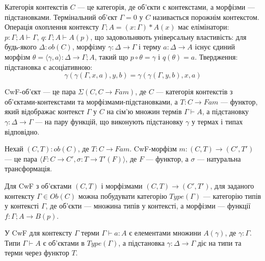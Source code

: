 \documentclass{article}
\begin{document}
\begin{definition}[Контекст]
Категорія контекстів $C$ --- це категорія, де об’єкти є контекстами, а морфізми --- підстановками. Термінальний об’єкт $\Gamma=0$ у $C$ називається порожнім контекстом. Операція охоплення контексту $\Gamma;A = (x:\Gamma)*A(x)$ має елімінатори: $p:\Gamma;A\vdash\Gamma$, $q:\Gamma;A\vdash A(p)$, що задовольняють універсальну властивість: для будь-якого $\Delta:ob(C)$, морфізму $\gamma:\Delta\rightarrow\Gamma$ і терму $a:\Delta\rightarrow A$ існує єдиний морфізм $\theta=\langle\gamma,a\rangle:\Delta\rightarrow\Gamma;A$, такий що $p\circ\theta=\gamma$ і $q(\theta)=a$. Твердження: підстановка є асоціативною:
\[
    \gamma(\gamma(\Gamma,x,a),y,b) = \gamma(\gamma(\Gamma,y,b),x,a)
\]
\end{definition}

\begin{definition}
CwF-об’єкт --- це пара $\Sigma(C, C\rightarrow Fam)$, де $C$ --- категорія контекстів з об’єктами-контекстами та морфізмами-підстановками, а $T:C\rightarrow Fam$ --- функтор, який відображає контекст $\Gamma$ у $C$ на сім’ю множин термів $\Gamma\vdash A$, а підстановку $\gamma:\Delta\rightarrow\Gamma$ --- на пару функцій, що виконують підстановку $\gamma$ у термах і типах відповідно.
\end{definition}

\begin{definition}
Нехай $(C,T):ob(C)$, де $T:C\rightarrow Fam$. CwF-морфізм $m: (C,T)\rightarrow(C',T')$ --- це пара $\langle F:C\rightarrow C', \sigma:T\rightarrow T'(F) \rangle$, де $F$ --- функтор, а $\sigma$ --- натуральна трансформація.
\end{definition}

\begin{definition}
Для CwF з об’єктами $(C,T)$ і морфізмами $(C,T)\rightarrow(C',T')$, для заданого контексту $\Gamma \in Ob(C)$ можна побудувати категорію $Type(\Gamma)$ --- категорію типів у контексті $\Gamma$, де об’єкти --- множина типів у контексті, а морфізми --- функції $f:\Gamma;A\rightarrow B(p)$.
\end{definition}

\begin{definition}
У CwF для контексту $\Gamma$ терми $\Gamma\vdash a:A$ є елементами множини $A(\gamma)$, де $\gamma:\Gamma$. Типи $\Gamma\vdash A$ є об’єктами в $Type(\Gamma)$, а підстановка $\gamma:\Delta\rightarrow\Gamma$ діє на типи та терми через функтор $T$.
\end{definition}
\end{document}
